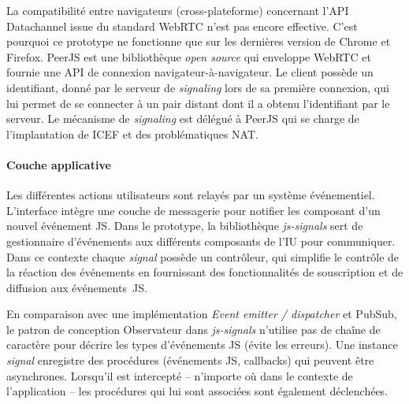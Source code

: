 La compatibilité entre navigateurs 
(cross-plateforme) concernant 
l'\gls{API} Datachannel issue du standard \gls{WebRTC} n'est pas encore 
effective. C'est pourquoi ce prototype ne fonctionne que sur les dernières 
version de Chrome et Firefox. PeerJS est une 
bibliothèque \textit{open source} qui enveloppe WebRTC et fournie une \gls{API} 
de connexion navigateur-à-navigateur.
Le client possède un identifiant, donné par le serveur de \textit{signaling} lors 
de sa première connexion, qui lui permet de se connecter à un pair distant 
dont il a obtenu l'identifiant par le serveur. Le mécanisme 
de \textit{signaling} est délégué à PeerJS qui se charge de l'implantation de 
\gls{ICEF} et des problématiques \gls{NAT}. 


		\paragraph{Couche applicative}
		
Les différentes actions utilisateurs sont relayés par un système 
événementiel. L'interface intègre une couche de messagerie pour notifier les 
composant d'un nouvel événement \gls{JS}. Dans le prototype, la 
bibliothèque 
\textit{js-signals} sert de gestionnaire d'événements aux différents 
composants de l'\gls{IU} pour 
communiquer. Dans ce contexte chaque \textit{signal} possède un 
contrôleur, qui simplifie le contrôle de la réaction des événements en 
fournissant des fonctionnalités de souscription et de diffusion aux
événements~\gls{JS}. 

En comparaison avec une implémentation \textit{Event 
emitter / dispatcher} et \gls{PubSub}, le patron de conception 
Observateur dans \textit{js-signals} n'utilise pas de chaîne de caractère pour 
décrire les types d'événements \gls{JS} (évite les erreurs).
Une instance \textit{signal} enregistre des procédures (événements \gls{JS}, 
callbacks) qui peuvent être asynchrones. 
Lorsqu'il est intercepté -- n'importe où dans le contexte de l'application -- les 
procédures qui lui sont associées sont également déclenchées.